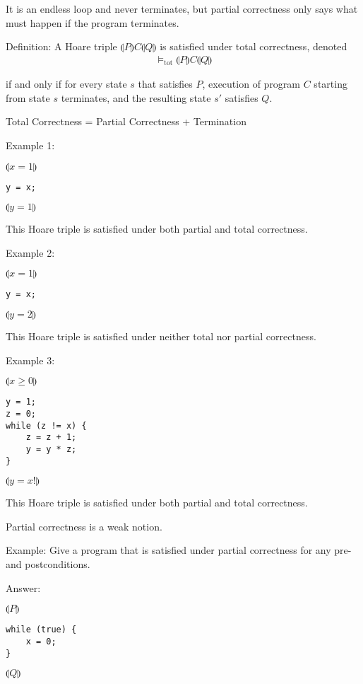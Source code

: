 \documentclass{article}
\begin{document}
It is an endless loop and never terminates, but partial correctness only says what must happen if the program terminates.

Definition: A Hoare triple $\llparenthesis P \rrparenthesis C \llparenthesis Q \rrparenthesis$ is satisfied under total correctness, denoted
\begin{align*}
\vDash_{\text{tot}} \llparenthesis P \rrparenthesis C \llparenthesis Q \rrparenthesis
\end{align*}

if and only if for every state $s$ that satisfies $P$, execution of program $C$ starting from state $s$ terminates, and the resulting state $s'$ satisfies $Q$.

Total Correctness = Partial Correctness + Termination

Example 1:

$\llparenthesis x = 1 \rrparenthesis$
\begin{verbatim}
y = x;
\end{verbatim}
$\llparenthesis y = 1 \rrparenthesis$

This Hoare triple is satisfied under both partial and total correctness.

Example 2:

$\llparenthesis x = 1 \rrparenthesis$
\begin{verbatim}
y = x;
\end{verbatim}
$\llparenthesis y= 2 \rrparenthesis$

This Hoare triple is satisfied under neither total nor partial correctness.

Example 3:

$\llparenthesis x \ge 0 \rrparenthesis$
\begin{verbatim}
y = 1;
z = 0;
while (z != x) {
    z = z + 1;
    y = y * z;
}
\end{verbatim}
$\llparenthesis y = x! \rrparenthesis$

This Hoare triple is satisfied under both partial and total correctness. 

Partial correctness is a weak notion.

Example: Give a program that is satisfied under partial correctness for any pre- and postconditions. 

Answer:

$\llparenthesis P \rrparenthesis$
\begin{verbatim}
while (true) {
    x = 0;
}
\end{verbatim}
$\llparenthesis Q \rrparenthesis$
\end{document}
